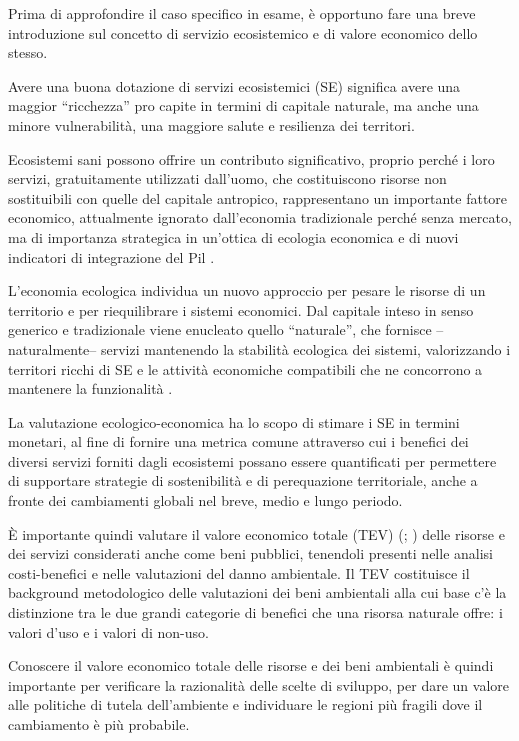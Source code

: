 \documentclass[14pt,a4paper]{article}
\begin{document}
	Prima di approfondire il caso specifico in esame, è opportuno fare una breve introduzione sul concetto di servizio ecosistemico e di valore economico dello stesso.
	
	Avere una buona dotazione di servizi ecosistemici (SE) significa avere una maggior ``ricchezza'' pro capite in termini di capitale naturale, ma anche una minore  vulnerabilità, una maggiore salute e resilienza dei territori.
	
	Ecosistemi sani possono offrire un contributo significativo, proprio perché i loro servizi, gratuitamente utilizzati dall'uomo, che costituiscono risorse non sostituibili con quelle del capitale antropico, rappresentano un importante fattore economico, attualmente ignorato dall'economia tradizionale perché senza mercato, ma di importanza strategica in un'ottica di ecologia economica e di nuovi indicatori di integrazione del Pil \cite{oltre_il_PIL}.
	
	L'economia ecologica individua un nuovo approccio per pesare le risorse di un territorio e per riequilibrare i sistemi economici. Dal capitale inteso in senso generico e tradizionale viene enucleato quello ``naturale'', che fornisce --naturalmente-- servizi mantenendo la stabilità ecologica dei sistemi, valorizzando i territori ricchi di SE e le attività economiche compatibili che ne concorrono a mantenere la funzionalità \cite{SE_e_Sostenibilita}. 
	
	La valutazione ecologico-economica ha lo scopo di stimare i SE in termini monetari, al fine di fornire una metrica comune	attraverso cui i benefici dei diversi servizi forniti dagli ecosistemi possano essere quantificati \cite{MEA_EcosystemsAndHumanWellBeing:Synthesis} per permettere di supportare strategie di sostenibilità e di perequazione territoriale, anche a fronte dei cambiamenti globali nel breve, medio e lungo periodo. 
	
	È importante quindi valutare il valore economico totale (TEV) (\cite{freeman2014measurement}; \cite{merlo2005valuing}) delle risorse e dei servizi considerati anche come beni pubblici, tenendoli presenti nelle analisi costi-benefici e nelle valutazioni del danno ambientale. Il TEV costituisce il background metodologico delle valutazioni dei beni ambientali alla cui base c'è la distinzione tra le due grandi categorie di benefici che una risorsa naturale offre: i valori d'uso e i valori di non-uso.  
	
	Conoscere il valore economico totale delle risorse e dei beni ambientali è quindi importante per verificare la razionalità delle scelte di sviluppo, per dare un valore alle politiche di tutela dell'ambiente e individuare le regioni più fragili dove il cambiamento è più probabile. 
	
\end{document}
